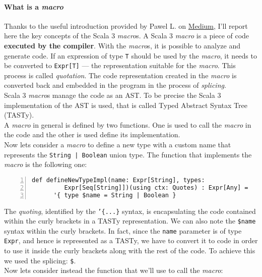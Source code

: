 \paragraph{What is a \textit{macro}}
Thanks to the useful introduction provided by Pawel L. on \href{https://medium.com/codex/scala-3-macros-without-pain-ce54d116880a}{Medium}, I'll report here the key concepts of the Scala 3 \textit{macro}s.
A Scala 3 \textit{macro} is a piece of code \textbf{executed by the compiler}.
With the \textit{macro}s, it is possible to analyze and generate code.
If an expression of type \texttt{T} should be used by the \textit{macro}, it needs to be converted to \texttt{Expr[T]} — the representation suitable for the \textit{macro}.
This process is called \textit{quotation}.
The code representation created in the \textit{macro} is converted back and embedded in the program in the process of \textit{splicing}.\\
Scala 3 \textit{macro}s manage the code as an AST. To be precise the Scala 3 implementation of the AST is used, that is called Typed Abstract Syntax Tree (TASTy).\\
A \textit{macro} in general is defined by two functions.
One is used to call the \textit{macro} in the code and the other is used define its implementation.\\
Now lets consider a \textit{macro} to define a new type with a custom name that represents the \texttt{String | Boolean} union type.
The function that implements the \textit{macro} is the following one:\\
\begin{minipage}{\linewidth}
  \begin{lstlisting}[numbers=left, numberstyle=\tiny, numbersep=-5pt, stepnumber=1]
    def defineNewTypeImpl(name: Expr[String], types:
         Expr[Seq[String]])(using ctx: Quotes) : Expr[Any] = 
      '{ type $name = String | Boolean }
  \end{lstlisting}
\end{minipage}
The \textit{quoting}, identified by the \texttt{'\{...\}} syntax, is encapsulating the code contained within the curly brackets in a TASTy representation.
We can also note the \texttt{\$name} syntax within the curly brackets.
In fact, since the \texttt{name} parameter is of type \texttt{Expr}, and hence is represented as a TASTy, we have to convert it to code in order to use it inside the curly brackets along with the rest of the code.
To achieve this we used the splicing: \texttt{\$}.\\
Now lets consider instead the function that we'll use to call the \textit{macro}:\\
